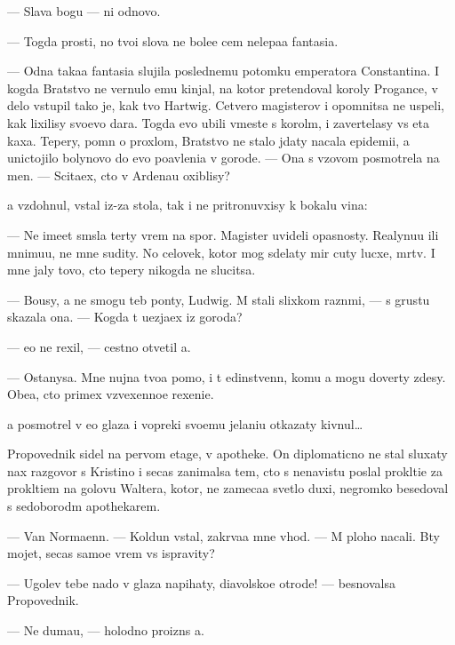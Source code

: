 \documentclass[10pt]{book}
\begin{document}
— Slava bogu — ni odnovo.

— Togda prosti, no tvo{\y}i slova ne bole{\y}e cem nelepa{\y}a fantasi{\y}a.

— Odna taka{\y}a fantasi{\y}a slujila poslednemu potomku emperatora Constantina. I kogda Bratstvo ne vernulo {\y}emu kinjal, na kotor{\yi}{\y} pretendoval koroly Progance, v delo vstupil tako{\y} je, kak tvo{\y} Hartwig. Cetvero magisterov i opomnitsa ne uspeli, kak lixilisy svo{\y}evo dara. Togda {\y}evo ubili vmeste s korol{\e}m, i zavertelasy vs{\ia} eta kaxa. Tepery, pomn{\ia} o proxlom, Bratstvo ne stalo jdaty nacala epidemi{\y}i, a unictojilo bolynovo do {\y}evo po{\y}avleni{\y}a v gorode. — Ona s v{\yi}zovom posmotrela na men{\ia}. — Scita{\y}ex, cto v Ardenau oxiblisy?

{\Y}a vzdohnul, vstal iz-za stola, tak i ne pritronuvxisy k bokalu vina:

— Ne ime{\y}et sm{\yi}sla ter{\ia}ty vrem{\ia} na spor{\yi}. Magister{\yi} uvideli opasnosty. Realynu{\y}u ili mnimu{\y}u, ne mne sudity. No celovek, kotor{\yi}{\y} mog sdelaty mir cuty lucxe, m{\e}rtv. I mne jaly tovo, cto tepery nikogda ne slucitsa.

— Bo{\y}usy, {\y}a ne smogu teb{\ia} pon{\ia}ty, Ludwig. M{\yi} stali slixkom razn{\yi}mi, — s grust{\y}u skazala ona. — Kogda t{\yi} u{\y}ezja{\y}ex iz goroda?

— {\Y}e{\x}o ne rexil, — cestno otvetil {\y}a.

— Ostanysa. Mne nujna tvo{\y}a pomo{\x}, i t{\yi} {\y}edinstvenn{\yi}{\y}, komu {\y}a mogu dover{\ia}ty zdesy. Obe{\x}a{\y}, cto primex vzvexenno{\y}e rexeni{\y}e.

{\Y}a posmotrel v {\y}e{\y}o glaza i vopreki svo{\y}emu jelani{\y}u otkazaty kivnul…

Propovednik sidel na pervom etage, v apotheke. On diplomaticno ne stal sluxaty nax razgovor s Kristino{\y} i se{\y}cas zanimalsa tem, cto s nenavist{\y}u pos{\yi}lal prokl{\ia}ti{\y}e za prokl{\ia}ti{\y}em na golovu Waltera, kotor{\yi}{\y}, ne zameca{\y}a svetlo{\y} duxi, negromko besedoval s sedoborod{\yi}m apothekarem.

— Van Normaenn. — Koldun vstal, zakr{\yi}va{\y}a mne v{\yi}hod. — M{\yi} ploho nacali. B{\yi}ty mojet, se{\y}cas samo{\y}e vrem{\ia} vs{\e} ispravity?

— Ugol{\y}ev tebe nado v glaza napihaty, diavolsko{\y}e otrod{\y}e! — besnovalsa Propovednik.

— Ne duma{\y}u, — holodno proizn{\e}s {\y}a.
\end{document}
